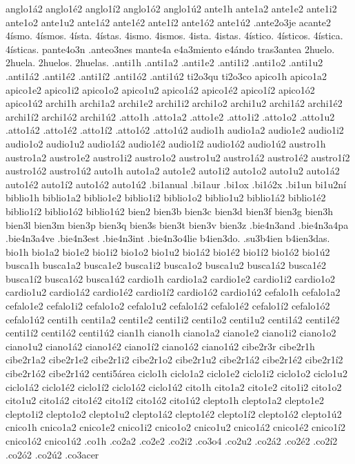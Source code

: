 {anglo1á2 anglo1é2 anglo1í2 anglo1ó2 anglo1ú2
ante1h
ante1a2 ante1e2 ante1i2 ante1o2 ante1u2
ante1á2 ante1é2 ante1í2 ante1ó2 ante1ú2
.ante2o3je
acante2
4ísmo.
4ísmos.
4ísta.
4ístas.
4ismo.
4ismos.
4ista.
4istas.
4ístico.
4ísticos.
4ística.
4ísticas.
pante4o3n
.anteo3nes
mante4a
e4a3miento
e4ándo
tras3antea
2huelo.
2huela.
2huelos.
2huelas.
.anti1h
.anti1a2 .anti1e2 .anti1i2 .anti1o2 .anti1u2
.anti1á2 .anti1é2 .anti1í2 .anti1ó2 .anti1ú2
ti2o3qu
ti2o3co
apico1h
apico1a2 apico1e2 apico1i2 apico1o2 apico1u2
apico1á2 apico1é2 apico1í2 apico1ó2 apico1ú2
archi1h
archi1a2 archi1e2 archi1i2 archi1o2 archi1u2
archi1á2 archi1é2 archi1í2 archi1ó2 archi1ú2
.atto1h
.atto1a2 .atto1e2 .atto1i2 .atto1o2 .atto1u2
.atto1á2 .atto1é2 .atto1í2 .atto1ó2 .atto1ú2
audio1h
audio1a2 audio1e2 audio1i2 audio1o2 audio1u2
audio1á2 audio1é2 audio1í2 audio1ó2 audio1ú2
austro1h
austro1a2 austro1e2 austro1i2 austro1o2 austro1u2
austro1á2 austro1é2 austro1í2 austro1ó2 austro1ú2
auto1h
auto1a2 auto1e2 auto1i2 auto1o2 auto1u2
auto1á2 auto1é2 auto1í2 auto1ó2 auto1ú2
.bi1anual
.bi1aur
.bi1ox
.bi1ó2x
.bi1un
bi1u2ní
biblio1h
biblio1a2 biblio1e2 biblio1i2 biblio1o2 biblio1u2
biblio1á2 biblio1é2 biblio1í2 biblio1ó2 biblio1ú2
bien2
bien3b
bien3c
bien3d
bien3f
bien3g
bien3h
bien3l
bien3m
bien3p
bien3q
bien3s
bien3t
bien3v
bien3z
.bie4n3and
.bie4n3a4pa
.bie4n3a4ve
.bie4n3est
.bie4n3int
.bie4n3o4lie
b4ien3do.
.su3b4ien
b4ien3das.
bio1h
bio1a2 bio1e2 bio1i2 bio1o2 bio1u2
bio1á2 bio1é2 bio1í2 bio1ó2 bio1ú2
busca1h
busca1a2 busca1e2 busca1i2 busca1o2 busca1u2
busca1á2 busca1é2 busca1í2 busca1ó2 busca1ú2
cardio1h
cardio1a2 cardio1e2 cardio1i2 cardio1o2 cardio1u2
cardio1á2 cardio1é2 cardio1í2 cardio1ó2 cardio1ú2
cefalo1h
cefalo1a2 cefalo1e2 cefalo1i2 cefalo1o2 cefalo1u2
cefalo1á2 cefalo1é2 cefalo1í2 cefalo1ó2 cefalo1ú2
centi1h
centi1a2 centi1e2 centi1i2 centi1o2 centi1u2
centi1á2 centi1é2 centi1í2 centi1ó2 centi1ú2
cian1h
ciano1h
ciano1a2 ciano1e2 ciano1i2 ciano1o2 ciano1u2
ciano1á2 ciano1é2 ciano1í2 ciano1ó2 ciano1ú2
cibe2r3r
cibe2r1h
cibe2r1a2 cibe2r1e2 cibe2r1i2 cibe2r1o2 cibe2r1u2
cibe2r1á2 cibe2r1é2 cibe2r1í2 cibe2r1ó2 cibe2r1ú2
centi5área
ciclo1h
ciclo1a2 ciclo1e2 ciclo1i2 ciclo1o2 ciclo1u2
ciclo1á2 ciclo1é2 ciclo1í2 ciclo1ó2 ciclo1ú2
cito1h
cito1a2 cito1e2 cito1i2 cito1o2 cito1u2
cito1á2 cito1é2 cito1í2 cito1ó2 cito1ú2
clepto1h
clepto1a2 clepto1e2 clepto1i2 clepto1o2 clepto1u2
clepto1á2 clepto1é2 clepto1í2 clepto1ó2 clepto1ú2
cnico1h
cnico1a2 cnico1e2 cnico1i2 cnico1o2 cnico1u2
cnico1á2 cnico1é2 cnico1í2 cnico1ó2 cnico1ú2
.co1h
.co2a2
.co2e2
.co2i2
.co3o4
.co2u2
.co2á2
.co2é2
.co2í2
.co2ó2
.co2ú2
.co3acer
}
